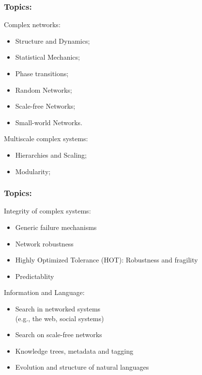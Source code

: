 \begin{frame}
  \frametitle{Topics:}

  \begin{block}{Complex networks:}
    \begin{itemize}
    \item 
      Structure and Dynamics;
    \item 
      Statistical Mechanics;
    \item 
      Phase transitions;
    \item 
      Random Networks;
    \item 
      Scale-free Networks;
    \item 
      Small-world Networks.
    \end{itemize}
  \end{block}

  \begin{block}{Multiscale complex systems:}
    \begin{itemize}
    \item 
      Hierarchies and Scaling;
    \item 
      Modularity;
    \end{itemize}
  \end{block}

\end{frame}

\begin{frame}
  \frametitle{Topics:}

  \begin{block}{Integrity of complex systems:}
    \begin{itemize}
    \item 
      Generic failure mechanisms
    \item 
      Network robustness
    \item 
      Highly Optimized Tolerance (HOT): Robustness and fragility
    \item 
      Predictablity
    \end{itemize}
  \end{block}

  \begin{block}{Information and Language:}
    \begin{itemize}
    \item 
      Search in networked systems \\ (e.g., the web, social systems)
    \item 
      Search on scale-free networks
    \item 
      Knowledge trees, metadata and tagging
    \item 
      Evolution and structure of natural languages
    \end{itemize}
  \end{block}

\end{frame}

